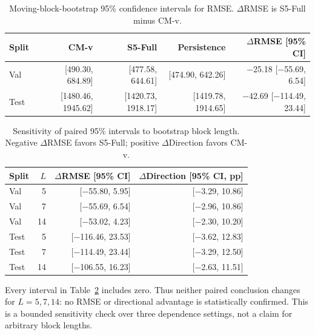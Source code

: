 \documentclass[13pt,a4paper,oneside]{report}
\begin{document}
\begin{table}[H]
\centering
\caption{Moving-block-bootstrap 95\% confidence intervals for RMSE. $\Delta$RMSE is S5-Full minus CM-v.}
\label{tab:rmse-ci}
{\scriptsize
\begin{tabular}{@{}lrrrr@{}}
\toprule
\textbf{Split} & \textbf{CM-v} & \textbf{S5-Full} & \textbf{Persistence} & \textbf{$\Delta$RMSE [95\% CI]} \\
\midrule
Val & [\num{490.30}, \num{684.89}] & [\num{477.58}, \num{644.61}] & [\num{474.90}, \num{642.26}] & \num{-25.18} [\num{-55.69}, \num{6.54}] \\
Test & [\num{1480.46}, \num{1945.62}] & [\num{1420.73}, \num{1918.17}] & [\num{1419.78}, \num{1914.65}] & \num{-42.69} [\num{-114.49}, \num{23.44}] \\
\bottomrule
\end{tabular}}
\end{table}

\begin{table}[H]
\centering
\caption{Sensitivity of paired 95\% intervals to bootstrap block length. Negative
$\Delta$RMSE favors S5-Full; positive $\Delta$Direction favors CM-v.}
\label{tab:block-sensitivity}
{\scriptsize
\begin{tabular}{@{}lrrr@{}}
\toprule
\textbf{Split} & \textbf{$L$} & \textbf{$\Delta$RMSE [95\% CI]} &
\textbf{$\Delta$Direction [95\% CI, pp]} \\
\midrule
Val & \num{5} & [\num{-55.80}, \num{5.95}] & [\num{-3.29}, \num{10.86}] \\
Val & \num{7} & [\num{-55.69}, \num{6.54}] & [\num{-2.96}, \num{10.86}] \\
Val & \num{14} & [\num{-53.02}, \num{4.23}] & [\num{-2.30}, \num{10.20}] \\
\midrule
Test & \num{5} & [\num{-116.46}, \num{23.53}] & [\num{-3.62}, \num{12.83}] \\
Test & \num{7} & [\num{-114.49}, \num{23.44}] & [\num{-3.29}, \num{12.50}] \\
Test & \num{14} & [\num{-106.55}, \num{16.23}] & [\num{-2.63}, \num{11.51}] \\
\bottomrule
\end{tabular}}
\end{table}

Every interval in Table~\ref{tab:block-sensitivity} includes zero. Thus neither paired conclusion
changes for $L=\num{5},\num{7},\num{14}$: no RMSE or directional advantage is statistically
confirmed. This is a bounded sensitivity check over three dependence settings, not a claim for
arbitrary block lengths.
\end{document}
